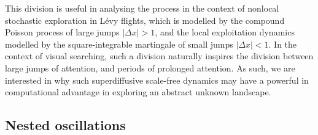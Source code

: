 This division is useful in analysing the process in the context of nonlocal stochastic exploration in Lévy flights, which is modelled by the compound Poisson process of large jumps $|\Delta x| > 1$, and the local exploitation dynamics modelled by the square-integrable martingale of small jumps $|\Delta x| < 1$. In the context of visual searching, such a division naturally inspires the division between large jumps of attention, and periods of prolonged attention. As such, we are interested in why such superdiffusive scale-free dynamics may have a powerful in computational advantage in exploring an abstract unknown landscape.

\subsection{Nested oscillations}